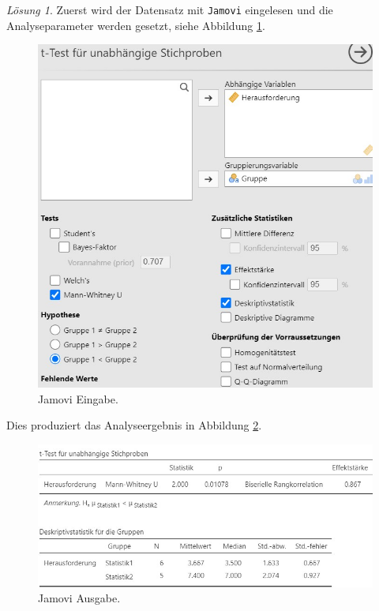 \documentclass[
]{book}
\theoremstyle{definition}
\theoremstyle{definition}
\theoremstyle{definition}
\theoremstyle{definition}
\theoremstyle{remark}
\newtheorem*{solution}{Lösung}
\begin{document}
\begin{solution}

Zuerst wird der Datensatz mit \texttt{Jamovi} eingelesen und die
Analyseparameter werden gesetzt, siehe Abbildung
\ref{fig:sol-statistik-herausforderung-input}.

\begin{figure}
\includegraphics[width=1\linewidth]{figures/07-exr-statistik-herausforderung-jmv-input} \caption{Jamovi Eingabe.}\label{fig:sol-statistik-herausforderung-input}
\end{figure}

Dies produziert das Analyseergebnis in Abbildung
\ref{fig:sol-statistik-herausforderung-output}.

\begin{figure}
\includegraphics[width=1\linewidth]{figures/07-exr-statistik-herausforderung-jmv-output} \caption{Jamovi Ausgabe.}\label{fig:sol-statistik-herausforderung-output}
\end{figure}


\end{solution}
\end{document}
